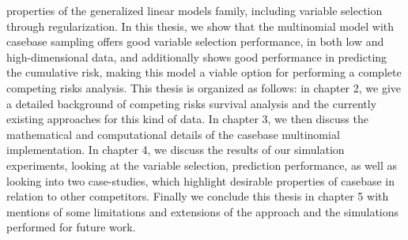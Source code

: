 properties of the generalized linear models family, including variable selection through regularization. In this thesis, we show that the multinomial model with casebase sampling offers good variable selection performance, in both low and high-dimensional data, and additionally shows good performance in predicting the cumulative risk, making this model a viable option for performing a complete competing risks analysis. This thesis is organized as follows: in chapter 2, we give a detailed background of competing risks survival analysis and the currently existing approaches for this kind of data. In chapter 3, we then discuss the mathematical and computational details of the casebase multinomial implementation. In chapter 4, we discuss the results of our simulation experiments, looking at the variable selection, prediction performance, as well as looking into two case-studies, which highlight desirable properties of casebase in relation to other competitors. Finally we conclude this thesis in chapter 5 with mentions of some limitations and extensions of the approach and the simulations performed for future work. 

 
